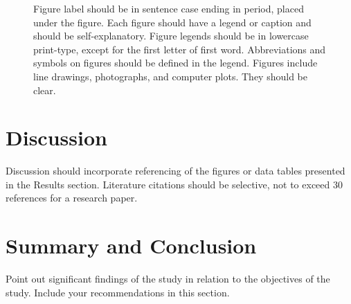 \documentclass{strrespaper-journ}
\begin{document}
	        \begin{figure}[htbp]
				\centering
	            \caption{
					Figure label should be in sentence case ending in period, placed under the figure.
					Each figure should have a legend or caption and should be self-explanatory.
					Figure legends should be in lowercase print-type, except for the first letter of first word.
					Abbreviations and symbols on figures should be defined in the legend.
					Figures include line drawings, photographs, and computer plots.
					They should be clear.
				}
	            \label{fig:bar_graph}
	        \end{figure}

    \section{Discussion}
		Discussion should incorporate referencing of the figures or data tables presented in the Results section.
		Literature citations should be selective, not to exceed 30 references for a research paper.

    \section{Summary and Conclusion}
		Point out significant findings of the study in relation to the objectives of the study.
		Include your recommendations in this section.
\end{document}
